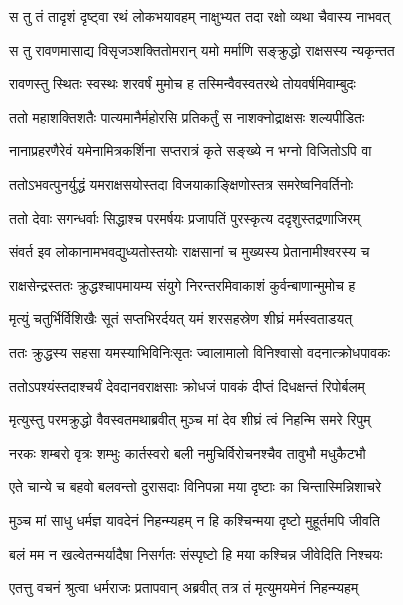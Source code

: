 \twolineshloka
{स तु तं तादृशं दृष्ट्वा रथं लोकभयावहम्}
{नाक्षुभ्यत तदा रक्षो व्यथा चैवास्य नाभवत्} %

\twolineshloka
{स तु रावणमासाद्य विसृजञ्शक्तितोमरान्}
{यमो मर्माणि सङ्क्रुद्धो राक्षसस्य न्यकृन्तत} %

\twolineshloka
{रावणस्तु स्थितः स्वस्थः शरवर्षं मुमोच ह}
{तस्मिन्वैवस्वतरथे तोयवर्षमिवाम्बुदः} %

\twolineshloka
{ततो महाशक्तिशतैः पात्यमानैर्महोरसि}
{प्रतिकर्तुं स नाशक्नोद्राक्षसः शल्यपीडितः} %

\twolineshloka
{नानाप्रहरणैरेवं यमेनामित्रकर्शिना}
{सप्तरात्रं कृते सङ्ख्ये न भग्नो विजितोऽपि वा} %

\twolineshloka
{ततोऽभवत्पुनर्युद्धं यमराक्षसयोस्तदा}
{विजयाकाङ्क्षिणोस्तत्र समरेष्वनिवर्तिनोः} %

\twolineshloka
{ततो देवाः सगन्धर्वाः सिद्धाश्च परमर्षयः}
{प्रजापतिं पुरस्कृत्य ददृशुस्तद्रणाजिरम्} %

\twolineshloka
{संवर्त इव लोकानामभवद्युध्यतोस्तयोः}
{राक्षसानां च मुख्यस्य प्रेतानामीश्वरस्य च} %

\twolineshloka
{राक्षसेन्द्रस्ततः क्रुद्धश्चापमायम्य संयुगे}
{निरन्तरमिवाकाशं कुर्वन्बाणान्मुमोच ह} %

\twolineshloka
{मृत्युं चतुर्भिर्विशिखैः सूतं सप्तभिरर्दयत्}
{यमं शरसहस्रेण शीघ्रं मर्मस्वताडयत्} %

\twolineshloka
{ततः क्रुद्धस्य सहसा यमस्याभिविनिःसृतः}
{ज्वालामालो विनिश्वासो वदनात्क्रोधपावकः} %

\twolineshloka
{ततोऽपश्यंस्तदाश्चर्यं देवदानवराक्षसाः}
{क्रोधजं पावकं दीप्तं दिधक्षन्तं रिपोर्बलम्} %

\twolineshloka
{मृत्युस्तु परमक्रुद्धो वैवस्वतमथाब्रवीत्}
{मुञ्च मां देव शीघ्रं त्वं निहन्मि समरे रिपुम्} %

\twolineshloka
{नरकः शम्बरो वृत्रः शम्भुः कार्तस्वरो बली}
{नमुचिर्विरोचनश्चैव तावुभौ मधुकैटभौ} %

\twolineshloka
{एते चान्ये च बहवो बलवन्तो दुरासदाः}
{विनिपन्ना मया दृष्टाः का चिन्तास्मिन्निशाचरे} %

\twolineshloka
{मुञ्च मां साधु धर्मज्ञ यावदेनं निहन्म्यहम्}
{न हि कश्चिन्मया दृष्टो मुहूर्तमपि जीवति} %

\twolineshloka
{बलं मम न खल्वेतन्मर्यादैषा निसर्गतः}
{संस्पृष्टो हि मया कश्चिन्न जीवेदिति निश्चयः} %

\twolineshloka
{एतत्तु वचनं श्रुत्वा धर्मराजः प्रतापवान्}
{अब्रवीत् तत्र तं मृत्युमयमेनं निहन्म्यहम्} %

